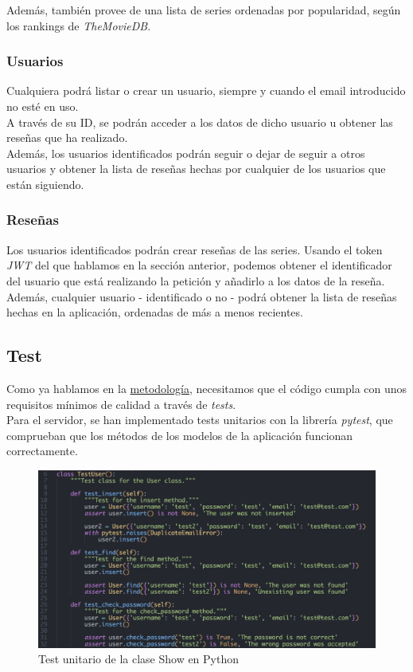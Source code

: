 Además, también provee de una lista de series ordenadas por popularidad, según los rankings de \textit{TheMovieDB}.

\subsubsection{Usuarios}
Cualquiera podrá listar o crear un usuario, siempre y cuando el email introducido no esté en uso.\\

A través de su ID, se podrán acceder a los datos de dicho usuario u obtener las reseñas que ha realizado.\\

Además, los usuarios identificados podrán seguir o dejar de seguir a otros usuarios y obtener la lista de reseñas hechas
por cualquier de los usuarios que están siguiendo.\\

\subsubsection{Reseñas}
Los usuarios identificados podrán crear reseñas de las series. Usando el token \textit{JWT} del que hablamos en la
sección anterior, podemos obtener el identificador del usuario que está realizando la petición y añadirlo a los datos de
la reseña.\\ 

Además, cualquier usuario - identificado o no - podrá obtener la lista de reseñas hechas en la aplicación, ordenadas de
más a menos recientes.\\

\subsection{Test}
Como ya hablamos en la \hyperref[chap:metodología]{metodología}, necesitamos que el código cumpla con unos requisitos
mínimos de calidad a través de \textit{tests}.\\

Para el servidor, se han implementado tests unitarios con la librería \textit{pytest}\cite{pytest}, que comprueban que
los métodos de los modelos de la aplicación funcionan correctamente.
\begin{figure}[H]
\centering	
    \includegraphics[scale=0.25]{img/pytest.png}
\caption{ Test unitario de la clase Show en Python }\label{fig:pytest}
\end{figure}

